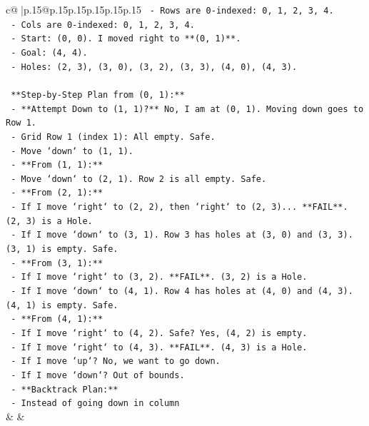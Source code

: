 \documentclass{article}
\begin{document}
{\begin{supertabular}{c@{$\;$}|p{.15\linewidth}@{}p{.15\linewidth}p{.15\linewidth}p{.15\linewidth}p{.15\linewidth}p{.15\linewidth}}
{{{\texttt{    {-} Rows are 0{-}indexed: 0, 1, 2, 3, 4.} \\
\texttt{    {-} Cols are 0{-}indexed: 0, 1, 2, 3, 4.} \\
\texttt{    {-} Start: (0, 0). I moved right to **(0, 1)**.} \\
\texttt{    {-} Goal: (4, 4).} \\
\texttt{    {-} Holes: (2, 3), (3, 0), (3, 2), (3, 3), (4, 0), (4, 3).} \\
\\ 
\texttt{    **Step{-}by{-}Step Plan from (0, 1):**} \\
\texttt{    {-} **Attempt Down to (1, 1)?** No, I am at (0, 1). Moving down goes to Row 1.} \\
\texttt{      {-} Grid Row 1 (index 1): All empty. Safe.} \\
\texttt{      {-} Move `down` to (1, 1).} \\
\texttt{    {-} **From (1, 1):**} \\
\texttt{      {-} Move `down` to (2, 1). Row 2 is all empty. Safe.} \\
\texttt{    {-} **From (2, 1):**} \\
\texttt{      {-} If I move `right` to (2, 2), then `right` to (2, 3)... **FAIL**. (2, 3) is a Hole.} \\
\texttt{      {-} If I move `down` to (3, 1). Row 3 has holes at (3, 0) and (3, 3). (3, 1) is empty. Safe.} \\
\texttt{    {-} **From (3, 1):**} \\
\texttt{      {-} If I move `right` to (3, 2). **FAIL**. (3, 2) is a Hole.} \\
\texttt{      {-} If I move `down` to (4, 1). Row 4 has holes at (4, 0) and (4, 3). (4, 1) is empty. Safe.} \\
\texttt{    {-} **From (4, 1):**} \\
\texttt{      {-} If I move `right` to (4, 2). Safe? Yes, (4, 2) is empty.} \\
\texttt{      {-} If I move `right` to (4, 3). **FAIL**. (4, 3) is a Hole.} \\
\texttt{      {-} If I move `up`? No, we want to go down.} \\
\texttt{      {-} If I move `down`? Out of bounds.} \\
\texttt{    {-} **Backtrack Plan:**} \\
\texttt{      {-} Instead of going down in column} \\
            }
        }
    }
    & & \\ \\


\end{supertabular}}
\end{document}

